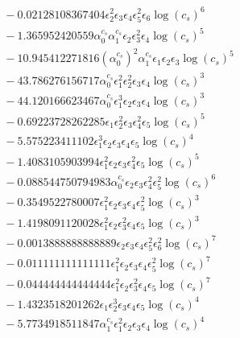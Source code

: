 \documentclass[10pt]{article}
\begin{document}
\begin{align*}
&{}  - 0.02128108367404 \epsilon_{2}^{2} \epsilon_{3} \epsilon_{4} \epsilon_{5}^{2} \epsilon_{6} \log{\left(c_{s} \right)}^{6} \\
&{}  - 1.365952420559 \alpha_{0}^{c_s} \alpha_{1}^{c_s} \epsilon_{2} \epsilon_{3}^{2} \epsilon_{4} \log{\left(c_{s} \right)}^{5} \\
&{}  - 10.945412271816 \left(\alpha_{0}^{c_s}\right)^{2} \alpha_{1}^{c_s} \epsilon_{1} \epsilon_{2} \epsilon_{3} \log{\left(c_{s} \right)}^{5} \\
&{}  - 43.786276156717 \alpha_{0}^{c_s} \epsilon_{1}^{2} \epsilon_{2}^{2} \epsilon_{3} \epsilon_{4} \log{\left(c_{s} \right)}^{3} \\
&{}  - 44.120166623467 \alpha_{0}^{c_s} \epsilon_{1}^{3} \epsilon_{2} \epsilon_{3} \epsilon_{4} \log{\left(c_{s} \right)}^{3} \\
&{}  - 0.69223728262285 \epsilon_{1} \epsilon_{2}^{2} \epsilon_{3} \epsilon_{4}^{2} \epsilon_{5} \log{\left(c_{s} \right)}^{5} \\
&{}  - 5.575223411102 \epsilon_{1}^{3} \epsilon_{2} \epsilon_{3} \epsilon_{4} \epsilon_{5} \log{\left(c_{s} \right)}^{4} \\
&{}  - 1.4083105903994 \epsilon_{1}^{2} \epsilon_{2} \epsilon_{3} \epsilon_{4}^{2} \epsilon_{5} \log{\left(c_{s} \right)}^{5} \\
&{}  - 0.088544750794983 \alpha_{0}^{c_s} \epsilon_{2} \epsilon_{3} \epsilon_{4}^{2} \epsilon_{5}^{2} \log{\left(c_{s} \right)}^{6} \\
&{}  - 0.3549522780007 \epsilon_{1}^{2} \epsilon_{2} \epsilon_{3} \epsilon_{4} \epsilon_{5}^{2} \log{\left(c_{s} \right)}^{3} \\
&{}  - 1.4198091120028 \epsilon_{1}^{2} \epsilon_{2} \epsilon_{3}^{2} \epsilon_{4} \epsilon_{5} \log{\left(c_{s} \right)}^{3} \\
&{}  - 0.0013888888888889 \epsilon_{2} \epsilon_{3} \epsilon_{4} \epsilon_{5}^{2} \epsilon_{6}^{2} \log{\left(c_{s} \right)}^{7} \\
&{}  - 0.011111111111111 \epsilon_{1}^{2} \epsilon_{2} \epsilon_{3} \epsilon_{4} \epsilon_{5}^{2} \log{\left(c_{s} \right)}^{7} \\
&{}  - 0.044444444444444 \epsilon_{1}^{2} \epsilon_{2} \epsilon_{3}^{2} \epsilon_{4} \epsilon_{5} \log{\left(c_{s} \right)}^{7} \\
&{}  - 1.4323518201262 \epsilon_{1} \epsilon_{2}^{3} \epsilon_{3} \epsilon_{4} \epsilon_{5} \log{\left(c_{s} \right)}^{4} \\
&{}  - 5.7734918511847 \alpha_{1}^{c_s} \epsilon_{1}^{2} \epsilon_{2} \epsilon_{3} \epsilon_{4} \log{\left(c_{s} \right)}^{4} \\

\end{align*}
\end{document}
